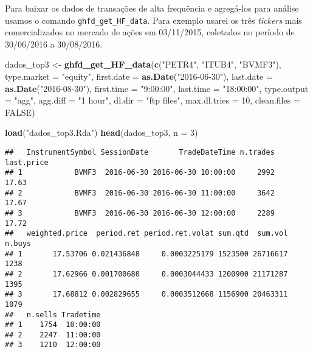 \documentclass[]{article}
\newenvironment{Shaded}{\begin{snugshade}}{\end{snugshade}}
\newcommand{\KeywordTok}[1]{\textcolor[rgb]{0.13,0.29,0.53}{\textbf{{#1}}}}
\newcommand{\DataTypeTok}[1]{\textcolor[rgb]{0.13,0.29,0.53}{{#1}}}
\newcommand{\DecValTok}[1]{\textcolor[rgb]{0.00,0.00,0.81}{{#1}}}
\newcommand{\StringTok}[1]{\textcolor[rgb]{0.31,0.60,0.02}{{#1}}}
\newcommand{\OtherTok}[1]{\textcolor[rgb]{0.56,0.35,0.01}{{#1}}}
\newcommand{\NormalTok}[1]{{#1}}
\begin{document}
Para baixar os dados de transações de alta frequência e agregá-los para
análise usamos o comando \texttt{ghfd\_get\_HF\_data}. Para exemplo
usarei os três \emph{tickers} mais comercializados no mercado de ações
em 03/11/2015, coletados no período de 30/06/2016 a 30/08/2016.

\begin{Shaded}
\begin{Highlighting}[]
\NormalTok{dados_top3 <-}\StringTok{ }\KeywordTok{ghfd_get_HF_data}\NormalTok{(}\KeywordTok{c}\NormalTok{(}\StringTok{"PETR4"}\NormalTok{, }\StringTok{"ITUB4"}\NormalTok{, }\StringTok{"BVMF3"}\NormalTok{), }\DataTypeTok{type.market =} \StringTok{"equity"}\NormalTok{, }
    \DataTypeTok{first.date =} \KeywordTok{as.Date}\NormalTok{(}\StringTok{"2016-06-30"}\NormalTok{), }\DataTypeTok{last.date =} \KeywordTok{as.Date}\NormalTok{(}\StringTok{"2016-08-30"}\NormalTok{), }
    \DataTypeTok{first.time =} \StringTok{"9:00:00"}\NormalTok{, }\DataTypeTok{last.time =} \StringTok{"18:00:00"}\NormalTok{, }\DataTypeTok{type.output =} \StringTok{"agg"}\NormalTok{, }
    \DataTypeTok{agg.diff =} \StringTok{"1 hour"}\NormalTok{, }\DataTypeTok{dl.dir =} \StringTok{"ftp files"}\NormalTok{, }\DataTypeTok{max.dl.tries =} \DecValTok{10}\NormalTok{, }\DataTypeTok{clean.files =} \OtherTok{FALSE}\NormalTok{)}
\end{Highlighting}
\end{Shaded}

\begin{Shaded}
\begin{Highlighting}[]
\KeywordTok{load}\NormalTok{(}\StringTok{"dados_top3.Rda"}\NormalTok{)}
\KeywordTok{head}\NormalTok{(dados_top3, }\DataTypeTok{n =} \DecValTok{3}\NormalTok{)}
\end{Highlighting}
\end{Shaded}

\begin{verbatim}
##   InstrumentSymbol SessionDate       TradeDateTime n.trades last.price
## 1            BVMF3  2016-06-30 2016-06-30 10:00:00     2992      17.63
## 2            BVMF3  2016-06-30 2016-06-30 11:00:00     3642      17.67
## 3            BVMF3  2016-06-30 2016-06-30 12:00:00     2289      17.72
##   weighted.price  period.ret period.ret.volat sum.qtd  sum.vol n.buys
## 1       17.53706 0.021436848     0.0003225179 1523500 26716617   1238
## 2       17.62966 0.001700680     0.0003044433 1200900 21171287   1395
## 3       17.68812 0.002829655     0.0003512668 1156900 20463311   1079
##   n.sells Tradetime
## 1    1754  10:00:00
## 2    2247  11:00:00
## 3    1210  12:00:00
\end{verbatim}
\end{document}
